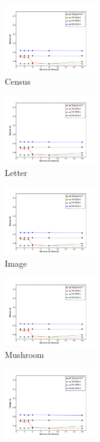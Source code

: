 \begin{figure}[H]
	\centering
	\begin{subfigure}{.24\textwidth}
		\centering
		\includegraphics[height=3cm]{images/census}
		\caption{Census}
		\label{fig:census}
	\end{subfigure}
	\begin{subfigure}{.24\textwidth}
		\centering
		\includegraphics[height=3cm]{images/letter}
		\caption{Letter}
		\label{fig:letter}
	\end{subfigure}
	\begin{subfigure}{.24\textwidth}
		\centering
		\includegraphics[height=3cm]{images/image}
		\caption{Image}
		\label{fig:image}
	\end{subfigure}
	\begin{subfigure}{.24\textwidth}
		\centering
		\includegraphics[height=3cm]{images/mushroom}
		\caption{Mushroom}
		\label{fig:mushroom}
	\end{subfigure}
	\begin{subfigure}{.24\textwidth}
		\centering
		\includegraphics[height=3cm]{images/sensors}

\end{subfigure}
\end{figure}
